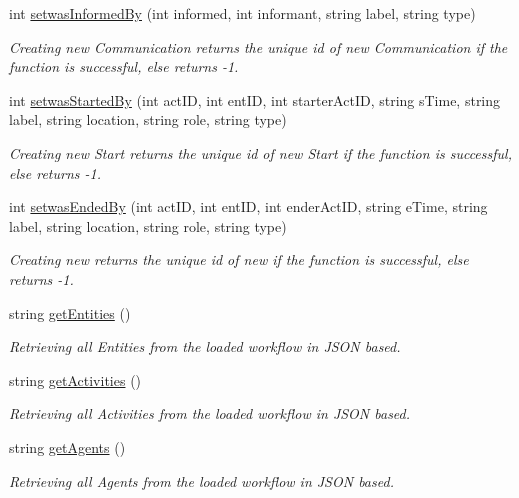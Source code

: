 \begin{DoxyCompactItemize}
int \hyperlink{class_in_di_prov_client_aa9fbfb3480eded57485c9d4585375625}{setwas\-Informed\-By} (int informed, int informant, string label, string type)
\begin{DoxyCompactList}\small\item\em Creating new Communication returns the unique id of new Communication if the function is successful, else returns -\/1. \end{DoxyCompactList}\item 
int \hyperlink{class_in_di_prov_client_a05a450e338417ff0966bba635834f64a}{setwas\-Started\-By} (int act\-I\-D, int ent\-I\-D, int starter\-Act\-I\-D, string s\-Time, string label, string location, string role, string type)
\begin{DoxyCompactList}\small\item\em Creating new Start returns the unique id of new Start if the function is successful, else returns -\/1. \end{DoxyCompactList}\item 
int \hyperlink{class_in_di_prov_client_aecb51b066ab1096fc095b00ec6e04c8b}{setwas\-Ended\-By} (int act\-I\-D, int ent\-I\-D, int ender\-Act\-I\-D, string e\-Time, string label, string location, string role, string type)
\begin{DoxyCompactList}\small\item\em Creating new returns the unique id of new if the function is successful, else returns -\/1. \end{DoxyCompactList}\item 
string \hyperlink{class_in_di_prov_client_aa2e07af7b32a73889ef3332f04bbcf1a}{get\-Entities} ()
\begin{DoxyCompactList}\small\item\em Retrieving all Entities from the loaded workflow in J\-S\-O\-N based. \end{DoxyCompactList}\item 
string \hyperlink{class_in_di_prov_client_a07d2197c8cce39ba7dd33edbfd09af78}{get\-Activities} ()
\begin{DoxyCompactList}\small\item\em Retrieving all Activities from the loaded workflow in J\-S\-O\-N based. \end{DoxyCompactList}\item 
string \hyperlink{class_in_di_prov_client_ab4b6f77ddb41281dd8714c7742faafbc}{get\-Agents} ()
\begin{DoxyCompactList}\small\item\em Retrieving all Agents from the loaded workflow in J\-S\-O\-N based. \end{DoxyCompactList}\item 

\end{DoxyCompactItemize}

